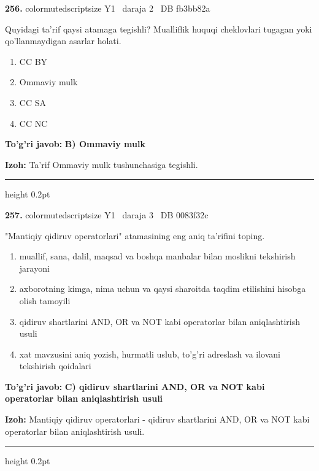\documentclass[10pt,a4paper,oneside]{article}
\begin{document}
\noindent\textbf{\color{ink}256.}  {color{muted}scriptsize Y1 \textbullet\ daraja 2 \textbullet\ DB fb3bb82a}
\par
Quyidagi ta'rif qaysi atamaga tegishli? Mualliflik huquqi cheklovlari tugagan yoki qo'llanmaydigan asarlar holati.
\begin{enumerate}[label=\Alph*),leftmargin=9mm]
\item CC BY
\item Ommaviy mulk
\item CC SA
\item CC NC
\end{enumerate}
\begin{tcolorbox}[enhanced,breakable,colback=teal!4,colframe=teal!50!black,boxrule=0.5pt,arc=1.1mm,left=3mm,right=3mm,top=1.7mm,bottom=1.7mm,before skip=2mm,after skip=2mm]
\textbf{\color{teal}To'g'ri javob:} \textbf{B) Ommaviy mulk}
\par\smallskip
\textbf{Izoh:} Ta'rif Ommaviy mulk tushunchasiga tegishli.
\end{tcolorbox}
\vspace{2mm}\hrule height 0.2pt \vspace{3mm}

\noindent\textbf{\color{ink}257.}  {color{muted}scriptsize Y1 \textbullet\ daraja 3 \textbullet\ DB 0083f32c}
\par
"Mantiqiy qidiruv operatorlari" atamasining eng aniq ta'rifini toping.
\begin{enumerate}[label=\Alph*),leftmargin=9mm]
\item muallif, sana, dalil, maqsad va boshqa manbalar bilan moslikni tekshirish jarayoni
\item axborotning kimga, nima uchun va qaysi sharoitda taqdim etilishini hisobga olish tamoyili
\item qidiruv shartlarini AND, OR va NOT kabi operatorlar bilan aniqlashtirish usuli
\item xat mavzusini aniq yozish, hurmatli uslub, to'g'ri adreslash va ilovani tekshirish qoidalari
\end{enumerate}
\begin{tcolorbox}[enhanced,breakable,colback=teal!4,colframe=teal!50!black,boxrule=0.5pt,arc=1.1mm,left=3mm,right=3mm,top=1.7mm,bottom=1.7mm,before skip=2mm,after skip=2mm]
\textbf{\color{teal}To'g'ri javob:} \textbf{C) qidiruv shartlarini AND, OR va NOT kabi operatorlar bilan aniqlashtirish usuli}
\par\smallskip
\textbf{Izoh:} Mantiqiy qidiruv operatorlari - qidiruv shartlarini AND, OR va NOT kabi operatorlar bilan aniqlashtirish usuli.
\end{tcolorbox}
\vspace{2mm}\hrule height 0.2pt \vspace{3mm}
\end{document}
